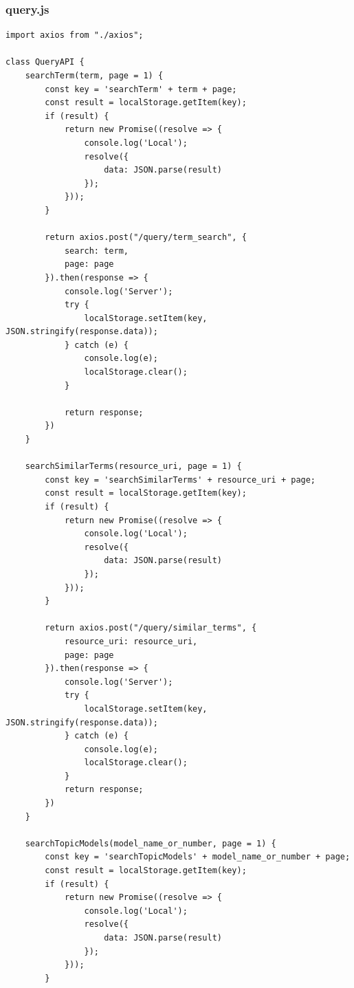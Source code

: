\documentclass[12pt, letterpaper]{article}
\begin{document}
\subsubsection{query.js}\label{appendix:frontend-query.js}

\begin{verbatim}
import axios from "./axios";

class QueryAPI {
    searchTerm(term, page = 1) {
        const key = 'searchTerm' + term + page;
        const result = localStorage.getItem(key);
        if (result) {
            return new Promise((resolve => {
                console.log('Local');
                resolve({
                    data: JSON.parse(result)
                });
            }));
        }

        return axios.post("/query/term_search", {
            search: term,
            page: page
        }).then(response => {
            console.log('Server');
            try {
                localStorage.setItem(key, JSON.stringify(response.data));
            } catch (e) {
                console.log(e);
                localStorage.clear();
            }

            return response;
        })
    }

    searchSimilarTerms(resource_uri, page = 1) {
        const key = 'searchSimilarTerms' + resource_uri + page;
        const result = localStorage.getItem(key);
        if (result) {
            return new Promise((resolve => {
                console.log('Local');
                resolve({
                    data: JSON.parse(result)
                });
            }));
        }

        return axios.post("/query/similar_terms", {
            resource_uri: resource_uri,
            page: page
        }).then(response => {
            console.log('Server');
            try {
                localStorage.setItem(key, JSON.stringify(response.data));
            } catch (e) {
                console.log(e);
                localStorage.clear();
            }
            return response;
        })
    }

    searchTopicModels(model_name_or_number, page = 1) {
        const key = 'searchTopicModels' + model_name_or_number + page;
        const result = localStorage.getItem(key);
        if (result) {
            return new Promise((resolve => {
                console.log('Local');
                resolve({
                    data: JSON.parse(result)
                });
            }));
        }


\end{verbatim}
\end{document}
